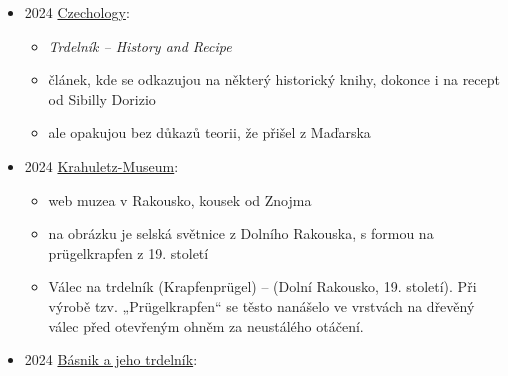 \begin{itemize}
\begin{itemize}
\begin{itemize}
      \begin{itemize}
      \tightlist
      \item
        revitalizace nezvnikla s cílem obovit starou moravskou tradici,
        ale čistě s podnikatelským cílem
      \item
        v Praze se v zájmu zatraktivnění pokrmu rozšířil narativ
        tradičnosti, proti tomu se ale dneska mnozí prodejci vymezujou,
        protože mezi domácím obyvatelstvem je to nežádoucí jev
      \item
        mnozí podnikatelé si vzali inspiraci z Čech a dneska se trdelník
        prodává v USA, Venezuele, Peru, Turecku, Francii nebo Řecku
      \item
        zhodnocení hypotéz:
      \item
        první se nepotvrdila, v otázce tradičnosti trdelníku je
        obyvatelstvo Česka rozdělený na dva tábory
      \item
        druhá se potvrdila, prodejci ho prodávají pro jeho komerční
        potenciál
      \item
        třetí se nepotvrdila, trdelník se nerevitalizoval v 90. let, ale
        spíš v půlce nultých
      \item
        nezodpovězenou otázkou zůstává příchod trdelníku do Skalice i na
        Moravu a proč se vytratil z českýho povědomí v 20. století
      \end{itemize}
    \end{itemize}
  \end{itemize}
\item
  2024
  \href{https://www.czechology.com/trdelnik-history-and-recipe/}{Czechology}:

  \begin{itemize}
  \tightlist
  \item
    \emph{Trdelník -- History and Recipe}
  \item
    článek, kde se odkazujou na některý historický knihy, dokonce i na
    recept od Sibilly Dorizio
  \item
    ale opakujou bez důkazů teorii, že přišel z Maďarska
  \end{itemize}
\item
  2024
  \href{https://www.websteiner.com/eggenburg23.html}{Krahuletz-Museum}:

  \begin{itemize}
  \tightlist
  \item
    web muzea v  Rakousko, kousek od Znojma
  \item
    na obrázku je selská světnice z Dolního Rakouska, s formou na
    prügelkrapfen z 19. století
  \item
    Válec na trdelník (Krapfenprügel) -- (Dolní Rakousko, 19. století).
    Při výrobě tzv. „Prügelkrapfen`` se těsto nanášelo ve vrstvách na
    dřevěný válec před otevřeným ohněm za neustálého otáčení.
  \end{itemize}
\item
  2024 \href{https://noveslovo.eu/domov/basnik-a-jeho-trdelnik/}{Básnik
  a jeho trdelník}:


\end{itemize}
